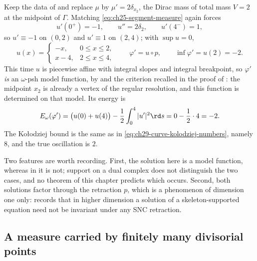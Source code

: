 \begin{example}
\label{ex:ch29-curve-dirac}
Keep the data of  and replace $\mu$ by
$\mu'=2\delta_{x_2}$, the Dirac mass of total mass $V=2$ at the midpoint
of $\Gamma$.  Matching \eqref{eq:ch25-segment-measure} again forces
\[
 u'(0^+)=-1,\qquad u''=2\delta_2,\qquad u'(4^-)=1 ,
\]
so $u'\equiv-1$ on $(0,2)$ and $u'\equiv1$ on $(2,4)$; with
$\sup u=0$,
\begin{equation}
\label{eq:ch29-curve-dirac-solution}
 u(x)=\begin{cases}-x,&0\leq x\leq2,\\ x-4,&2\leq x\leq4,\end{cases}
 \qquad
 \varphi'=u\circ p,
 \qquad \inf\varphi'=u(2)=-2 .
\end{equation}
This time $u$ is piecewise affine with integral slopes and integral
breakpoint, so $\varphi'$ \emph{is} an $\omega$-psh model function, by
 and the criterion recalled in the proof of
: the midpoint $x_2$ is already a vertex of the regular resolution,
and this function is determined on that model.  Its energy is
\[
 E_\omega(\varphi')
 =\bigl(u(0)+u(4)\bigr)-\frac12\int_0^4|u'|^2\rd s
 =0-\frac12\cdot4=-2 .
\]
The Ko\l odziej bound is the same as in
\eqref{eq:ch29-curve-kolodziej-numbers}, namely $8$, and the true
oscillation is $2$.

Two features are worth recording.  First, the solution here is a model
function, whereas in  it is not; support on a
dual complex does not distinguish the two cases, and no theorem of this
chapter predicts which occurs.  Second, both solutions factor through the
retraction $p$, which is a phenomenon of dimension one only:
 records that in higher dimension a
solution of a skeleton-supported equation need not be invariant under any
SNC retraction.
\end{example}

\subsection{A measure carried by finitely many divisorial points}
\label{sec:ch29-ex-divisorial}

